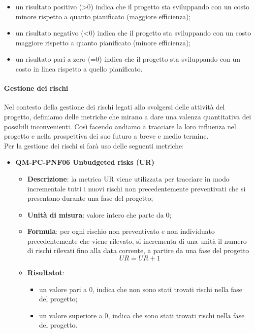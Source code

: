 \begin{itemize}
\begin{itemize}
\begin{itemize}
                                    \item un risultato positivo (>0) indica che il progetto sta sviluppando con un costo minore rispetto a quanto pianificato (maggiore efficienza);
                                    \item un risultato negativo (<0) indica che il progetto sta sviluppando con un costo maggiore rispetto a quanto pianificato (minore efficienza);
                                    \item un risultato pari a zero (=0) indica che il progetto sta sviluppando con un costo in linea rispetto a quello pianificato.
                                \end{itemize}
                        \end{itemize}
                \end{itemize}
            \paragraph{Gestione dei rischi}
                Nel contesto della gestione dei rischi legati allo svolgersi delle attività del progetto, definiamo delle metriche che mirano a dare una valenza quantitativa dei possibili inconvenienti. Così facendo andiamo a tracciare la loro influenza nel progetto e nella prospettiva dei suo futuro a breve e medio termine.\\
                Per la gestione dei rischi si farà uso delle seguenti metriche:
                \begin{itemize}
                    \item\textbf{QM-PC-PNF06 Unbudgeted risks (UR)}
                        \begin{itemize}
                            \item\textbf{Descrizione}: la metrica UR viene utilizzata per tracciare in modo incrementale tutti i nuovi rischi non precedentemente preventivati che si presentano durante una fase del progetto;
                            \item\textbf{Unità di misura}: valore intero che parte da 0;
                            \item\textbf{Formula}: per ogni rischio non preventivato e non individuato precedentemente che viene rilevato, si incrementa di una unità il numero di rischi rilevati fino alla data corrente, a partire da una fase del progetto
                                \[UR = UR + 1 \]
                            \item\textbf{Risultatot}:
                                \begin{itemize}
                                    \item un valore pari a 0, indica che non sono stati trovati rischi nella fase del progetto;
                                    \item un valore superiore a 0, indica che sono stati trovati rischi nella fase del progetto.
                                \end{itemize}
                        \end{itemize}
                \end{itemize}
